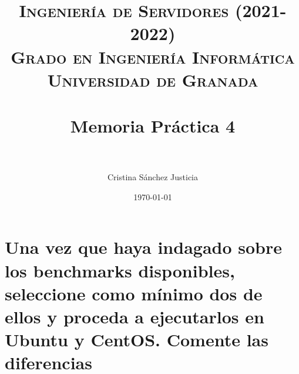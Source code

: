 


\title{	
\normalfont \normalsize 
\textsc{\textbf{Ingeniería de Servidores (2021-2022)} \\ Grado en Ingeniería Informática \\ Universidad de Granada} \\ [25pt] %
\horrule{0.5pt} \\[0.4cm] %
\huge Memoria Práctica 4 \\ %
\horrule{2pt} \\[0.5cm] %
}

\author{Cristina Sánchez Justicia} %

\date{\normalsize\today} %




\maketitle %

\newpage %

\tableofcontents %

\listoffigures

\listoftables


\section{Una vez que haya indagado sobre los benchmarks disponibles, seleccione como mínimo dos de ellos y proceda a ejecutarlos en Ubuntu y CentOS.
Comente las diferencias}

